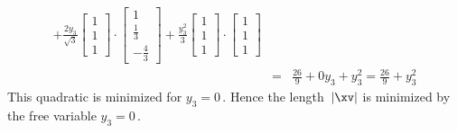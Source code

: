 \begin{example}
\begin{solution}
\begin{eqnarray*}
+\frac{2y_3}{\sqrt3}\begin{bmatrix} 1\\1\\1 \end{bmatrix}\cdot\begin{bmatrix} 1\\\frac13\\-\frac43 \end{bmatrix}
+\frac{y_3^2}{3}\begin{bmatrix} 1\\1\\1 \end{bmatrix}
\cdot\begin{bmatrix} 1\\1\\1 \end{bmatrix}
\\&=&\tfrac{26}9+0y_3+y_3^2
=\tfrac{26}9+y_3^2
\end{eqnarray*}
This quadratic is minimized for \(y_3=0\)\,.
Hence the length~\(|\xv|\) is minimized by the free variable \(y_3=0\)\,.
\end{solution}
\end{example}


